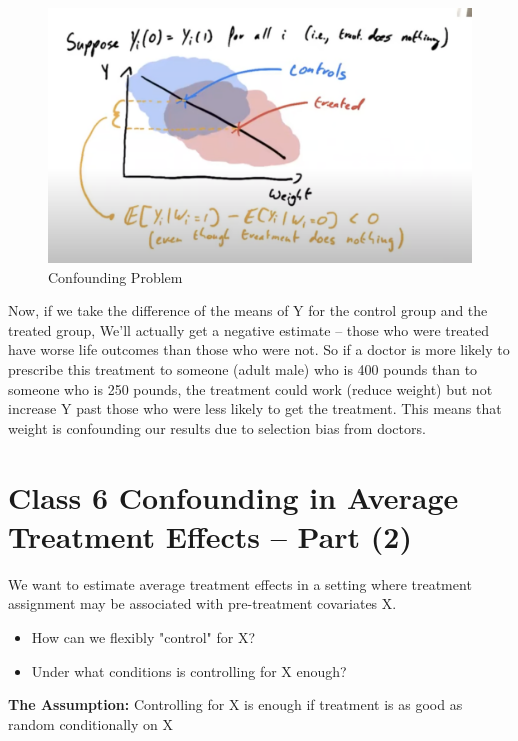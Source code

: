 \documentclass{article}
\begin{document}
\begin{figure}[H]
    \centering
    \includegraphics[scale = 0.3]{confound_rct.png}
    \caption{Confounding Problem}
    \label{fig:confound}
\end{figure}

Now, if we take the difference of the means of Y for the control group and the treated group, We'll actually get a negative estimate -- those who were treated have worse life outcomes than those who were not. So if a doctor is more likely to prescribe this treatment to someone (adult male) who is 400 pounds than to someone who is 250 pounds, the treatment could work (reduce weight) but not increase Y past those who were less likely to get the treatment. This means that weight is confounding our results due to selection bias from doctors.







\section{Class 6 Confounding in Average Treatment Effects -- Part (2)}


We want to estimate average treatment effects in a setting where treatment assignment may be associated with pre-treatment covariates X.
\begin{itemize}
    \item How can we flexibly "control" for X?

    \item Under what conditions is controlling for X enough?
\end{itemize}

\textbf{The Assumption:} Controlling for X is enough if treatment is as good as random conditionally on X
\end{document}
